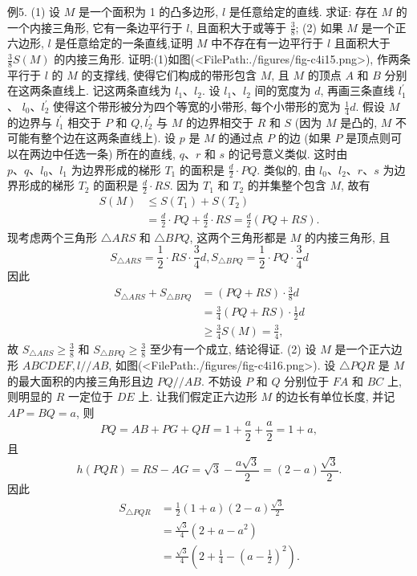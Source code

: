 例5. (1) 设 $M$ 是一个面积为 1 的凸多边形, $l$ 是任意给定的直线.
求证: 存在 $M$ 的一个内接三角形, 它有一条边平行于 $l$, 且面积大于或等于 $\frac{3}{8}$;
(2) 如果 $M$ 是一个正六边形, $l$ 是任意给定的一条直线,证明 $M$ 中不存在有一边平行于 $l$ 且面积大于 $\frac{3}{8} S(M)$ 的内接三角形.
证明:(1)如图(<FilePath:./figures/fig-c4i15.png>), 作两条平行于 $l$ 的 $M$ 的支撑线, 使得它们构成的带形包含 $M$, 且 $M$ 的顶点 $A$ 和 $B$ 分别在这两条直线上.
记这两条直线为 $l_1 、 l_2$. 设 $l_1 、 l_2$ 间的宽度为 $d$, 再画三条直线 $l_1^{\prime}$ 、 $l_0 、 l_2^{\prime}$ 使得这个带形被分为四个等宽的小带形, 每个小带形的宽为 $\frac{1}{4} d$.
假设 $M$ 的边界与 $l_1^{\prime}$ 相交于 $P$ 和 $Q, l_2^{\prime}$ 与 $M$ 的边界相交于 $R$ 和 $S$ (因为 $M$ 是凸的, $M$ 不可能有整个边在这两条直线上). 设 $p$ 是 $M$ 的通过点 $P$ 的边 (如果 $P$ 是顶点则可以在两边中任选一条) 所在的直线, $q 、 r$ 和 $s$ 的记号意义类似.
这时由 $p 、 q 、 l_0 、 l_1$ 为边界形成的梯形 $T_1$ 的面积是 $\frac{d}{2} \cdot P Q$. 类似的, 由 $l_0 、 l_2 、 r 、 s$ 为边界形成的梯形 $T_2$ 的面积是 $\frac{d}{2} \cdot R S$. 因为 $T_1$ 和 $T_2$ 的并集整个包含 $M$, 故有
$$
\begin{aligned}
S(M) & \leqslant S\left(T_1\right)+S\left(T_2\right) \\
& =\frac{d}{2} \cdot P Q+\frac{d}{2} \cdot R S=\frac{d}{2}(P Q+R S) .
\end{aligned}
$$
现考虑两个三角形 $\triangle A R S$ 和 $\triangle B P Q$, 这两个三角形都是 $M$ 的内接三角形, 且
$$
S_{\triangle A R S}=\frac{1}{2} \cdot R S \cdot \frac{3}{4} d, S_{\triangle B P Q}=\frac{1}{2} \cdot P Q \cdot \frac{3}{4} d
$$
因此
$$
\begin{aligned}
S_{\triangle A R S}+S_{\triangle B P Q} & =(P Q+R S) \cdot \frac{3}{8} d \\
& =\frac{3}{4}(P Q+R S) \cdot \frac{1}{2} d \\
& \geqslant \frac{3}{4} S(M)=\frac{3}{4},
\end{aligned}
$$
故 $S_{\triangle A R S} \geqslant \frac{3}{8}$ 和 $S_{\triangle B P Q} \geqslant \frac{3}{8}$ 至少有一个成立, 结论得证.
(2) 设 $M$ 是一个正六边形 $A B C D E F, l / / A B$, 如图(<FilePath:./figures/fig-c4i16.png>). 设 $\triangle P Q R$ 是 $M$ 的最大面积的内接三角形且边 $P Q / / A B$. 不妨设 $P$ 和 $Q$ 分别位于 $F A$ 和 $B C$ 上, 则明显的 $R$ 一定位于 $D E$ 上.
让我们假定正六边形 $M$ 的边长有单位长度, 并记 $A P=B Q=a$, 则
$$
P Q=A B+P G+Q H=1+\frac{a}{2}+\frac{a}{2}=1+a,
$$
且
$$
h(P Q R)=R S-A G=\sqrt{3}-\frac{a \sqrt{3}}{2}=(2-a) \frac{\sqrt{3}}{2} .
$$
因此
$$
\begin{aligned}
S_{\triangle P Q R} & =\frac{1}{2}(1+a)(2-a) \frac{\sqrt{3}}{2} \\
& =\frac{\sqrt{3}}{4}\left(2+a-a^2\right) \\
& =\frac{\sqrt{3}}{4}\left(2+\frac{1}{4}-\left(a-\frac{1}{2}\right)^2\right) .
\end{aligned}
$$

